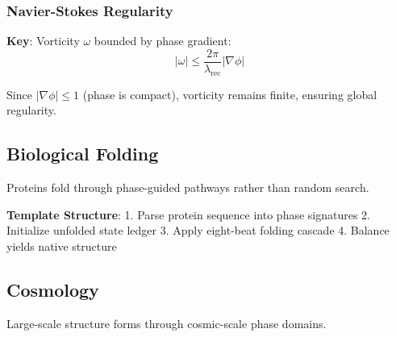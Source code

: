 \documentclass[12pt,a4paper]{article}
\begin{document}
\subsubsection{Navier-Stokes Regularity}

\textbf{Key}: Vorticity $\omega$ bounded by phase gradient:
\begin{equation}
|\omega| \leq \frac{2\pi}{\lambda_{\text{rec}}} |\nabla \phi|
\end{equation}

Since $|\nabla \phi| \leq 1$ (phase is compact), vorticity remains finite, ensuring global regularity.

\subsection{Biological Folding}

Proteins fold through phase-guided pathways rather than random search.

\textbf{Template Structure}:
1. Parse protein sequence into phase signatures
2. Initialize unfolded state ledger
3. Apply eight-beat folding cascade
4. Balance yields native structure

\subsection{Cosmology}

Large-scale structure forms through cosmic-scale phase domains.
\end{document}
